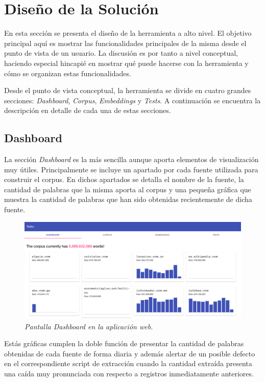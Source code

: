 \section{Diseño de la Solución}

En esta sección se presenta el diseño de la herramienta a alto nivel. El objetivo principal aquí es
mostrar las funcionalidades principales de la misma desde el punto de vista de un usuario. La discusión
es por tanto a nivel conceptual, haciendo especial hincapié en mostrar qué puede hacerse con la herramienta
y cómo se organizan estas funcionalidades.

Desde el punto de vista conceptual, la herramienta se divide en cuatro grandes secciones:
\textit{Dashboard}, \textit{Corpus}, \textit{Embeddings} y \textit{Tests}. A continuación se encuentra la
descripción en detalle de cada una de estas secciones.

\subsection{Dashboard}

La sección \textit{Dashboard} es la más sencilla aunque aporta elementos de visualización muy útiles.
Principalmente se incluye un apartado por cada fuente utilizada para construir el corpus. En dichos
apartados se detalla el nombre de la fuente, la cantidad de palabras que la misma aporta al corpus y una
pequeña gráfica que muestra la cantidad de palabras que han sido obtenidas recientemente de dicha fuente.

\begin{figure}[h]
    \centering
    \includegraphics[width=\textwidth]{images/ui-nabu-dashboard}
    \caption{\textit{Pantalla Dashboard en la aplicación web.}}
    \label{fig:ui-nabu-dashboard}
\end{figure}

Estás gráficas cumplen la doble función de presentar la cantidad de palabras obtenidas de cada fuente de
forma diaria y además alertar de un posible defecto en el correspondiente script de extracción cuando la
cantidad extraída presenta una caída muy pronunciada con respecto a registros inmediatamente anteriores.

